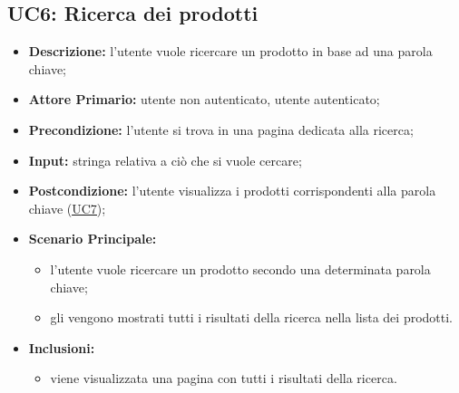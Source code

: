 \subsection{UC6: Ricerca dei prodotti}
\label{sec:UC6}
\begin{itemize}
    \item \textbf{Descrizione:} l'utente vuole ricercare un prodotto in base ad una parola chiave;
    \item \textbf{Attore Primario:} utente non autenticato, utente autenticato;
    \item \textbf{Precondizione:} l'utente si trova in una pagina dedicata alla ricerca;
    \item \textbf{Input:} stringa relativa a ciò che si vuole cercare;
    \item \textbf{Postcondizione:} l'utente visualizza i prodotti corrispondenti alla parola chiave (\hyperref[sec:UC7]{\underline{UC7}});
    \item \textbf{Scenario Principale:}
          \begin{itemize}
              \item l'utente vuole ricercare un prodotto secondo una determinata parola chiave;
              \item gli vengono mostrati tutti i risultati della ricerca nella lista dei prodotti.
          \end{itemize}
    \item \textbf{Inclusioni:}
          \begin{itemize}
              \item viene visualizzata una pagina con tutti i risultati della ricerca.
          \end{itemize}
\end{itemize}

